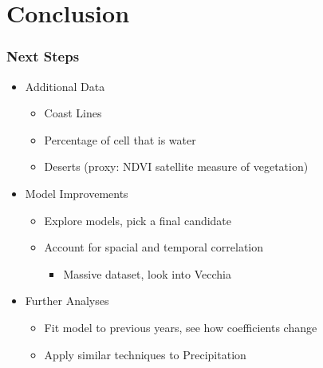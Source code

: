 \documentclass{beamer}
\begin{document}


\section{Conclusion}

    \begin{frame}
        \frametitle{Next Steps}
        \begin{itemize}
            \item Additional Data
                \begin{itemize}
                    \item Coast Lines
                    \item Percentage of cell that is water
                    \item Deserts (proxy: NDVI satellite measure of vegetation) 
                \end{itemize}
            \item Model Improvements
                \begin{itemize}
                    \item Explore models, pick a final candidate 
                    \item Account for spacial and temporal correlation
                    \begin{itemize}
                        \item Massive dataset, look into Vecchia
                    \end{itemize}
                \end{itemize}
            \item Further Analyses
                \begin{itemize}
                    \item Fit model to previous years, see how coefficients change
                    \item Apply similar techniques to Precipitation
                \end{itemize}
        \end{itemize}

    \end{frame}   
\end{document}
